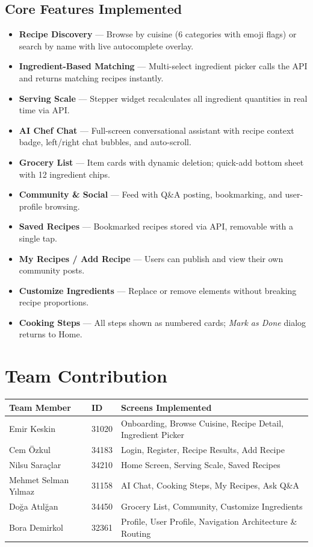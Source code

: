 \documentclass[11pt,a4paper]{article}
\begin{document}
\subsection*{Core Features Implemented}
\begin{itemize}
  \item \textbf{Recipe Discovery} — Browse by cuisine (6 categories with emoji flags) or search by name with live autocomplete overlay.
  \item \textbf{Ingredient-Based Matching} — Multi-select ingredient picker calls the API and returns matching recipes instantly.
  \item \textbf{Serving Scale} — Stepper widget recalculates all ingredient quantities in real time via API.
  \item \textbf{AI Chef Chat} — Full-screen conversational assistant with recipe context badge, left/right chat bubbles, and auto-scroll.
  \item \textbf{Grocery List} — Item cards with dynamic deletion; quick-add bottom sheet with 12 ingredient chips.
  \item \textbf{Community \& Social} — Feed with Q\&A posting, bookmarking, and user-profile browsing.
  \item \textbf{Saved Recipes} — Bookmarked recipes stored via API, removable with a single tap.
  \item \textbf{My Recipes / Add Recipe} — Users can publish and view their own community posts.
  \item \textbf{Customize Ingredients} — Replace or remove elements without breaking recipe proportions.
  \item \textbf{Cooking Steps} — All steps shown as numbered cards; \emph{Mark as Done} dialog returns to Home.
\end{itemize}

\section{Team Contribution}

\begin{center}
\begin{tabularx}{0.97\textwidth}{llX}
\toprule
\textbf{Team Member} & \textbf{ID} & \textbf{Screens Implemented} \\
\midrule
Emir Keskin          & 31020 & Onboarding, Browse Cuisine, Recipe Detail, Ingredient Picker \\
Cem Özkul            & 34183 & Login, Register, Recipe Results, Add Recipe \\
Nilsu Saraçlar       & 34210 & Home Screen, Serving Scale, Saved Recipes \\
Mehmet Selman Yılmaz & 31158 & AI Chat, Cooking Steps, My Recipes, Ask Q\&A \\
Doğa Atılğan         & 34450 & Grocery List, Community, Customize Ingredients \\
Bora Demirkol        & 32361 & Profile, User Profile, Navigation Architecture \& Routing \\
\bottomrule
\end{tabularx}
\end{center}
\end{document}
